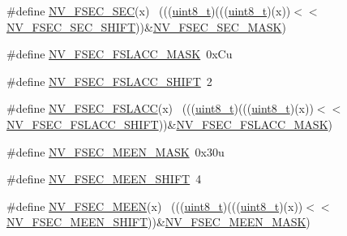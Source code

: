 \begin{DoxyCompactItemize}
\#define \hyperlink{group___n_v___register___masks_gad5a8a12d54435f49c62b7f43b53513a8}{N\+V\+\_\+\+F\+S\+E\+C\+\_\+\+S\+EC}(x)                                                  ~(((\hyperlink{_p_e___types_8h_aba7bc1797add20fe3efdf37ced1182c5}{uint8\+\_\+t})(((\hyperlink{_p_e___types_8h_aba7bc1797add20fe3efdf37ced1182c5}{uint8\+\_\+t})(x))$<$$<$\hyperlink{group___n_v___register___masks_ga92a819b24b0472a83857ddd2d950ab08}{N\+V\+\_\+\+F\+S\+E\+C\+\_\+\+S\+E\+C\+\_\+\+S\+H\+I\+FT}))\&\hyperlink{group___n_v___register___masks_gab159c721c6cde1f629b630c573da8ea9}{N\+V\+\_\+\+F\+S\+E\+C\+\_\+\+S\+E\+C\+\_\+\+M\+A\+SK})
\item 
\#define \hyperlink{group___n_v___register___masks_ga8fd3b6696c82aa96017fe25be34d19c9}{N\+V\+\_\+\+F\+S\+E\+C\+\_\+\+F\+S\+L\+A\+C\+C\+\_\+\+M\+A\+SK}~0x\+Cu
\item 
\#define \hyperlink{group___n_v___register___masks_gaba549ee99b8ca1af3531eafd5746f6b6}{N\+V\+\_\+\+F\+S\+E\+C\+\_\+\+F\+S\+L\+A\+C\+C\+\_\+\+S\+H\+I\+FT}~2
\item 
\#define \hyperlink{group___n_v___register___masks_gae4a6264735dd8537ff6a3a993a8c50d8}{N\+V\+\_\+\+F\+S\+E\+C\+\_\+\+F\+S\+L\+A\+CC}(x)                                            ~(((\hyperlink{_p_e___types_8h_aba7bc1797add20fe3efdf37ced1182c5}{uint8\+\_\+t})(((\hyperlink{_p_e___types_8h_aba7bc1797add20fe3efdf37ced1182c5}{uint8\+\_\+t})(x))$<$$<$\hyperlink{group___n_v___register___masks_gaba549ee99b8ca1af3531eafd5746f6b6}{N\+V\+\_\+\+F\+S\+E\+C\+\_\+\+F\+S\+L\+A\+C\+C\+\_\+\+S\+H\+I\+FT}))\&\hyperlink{group___n_v___register___masks_ga8fd3b6696c82aa96017fe25be34d19c9}{N\+V\+\_\+\+F\+S\+E\+C\+\_\+\+F\+S\+L\+A\+C\+C\+\_\+\+M\+A\+SK})
\item 
\#define \hyperlink{group___n_v___register___masks_ga02f5aa86e1f5bceefd0378fa736d5656}{N\+V\+\_\+\+F\+S\+E\+C\+\_\+\+M\+E\+E\+N\+\_\+\+M\+A\+SK}~0x30u
\item 
\#define \hyperlink{group___n_v___register___masks_ga13adfbdf46af9e59b446d17ce90b49c1}{N\+V\+\_\+\+F\+S\+E\+C\+\_\+\+M\+E\+E\+N\+\_\+\+S\+H\+I\+FT}~4
\item 
\#define \hyperlink{group___n_v___register___masks_gafb2cb85643ad7aa0997ed49baa90379f}{N\+V\+\_\+\+F\+S\+E\+C\+\_\+\+M\+E\+EN}(x)                                                ~(((\hyperlink{_p_e___types_8h_aba7bc1797add20fe3efdf37ced1182c5}{uint8\+\_\+t})(((\hyperlink{_p_e___types_8h_aba7bc1797add20fe3efdf37ced1182c5}{uint8\+\_\+t})(x))$<$$<$\hyperlink{group___n_v___register___masks_ga13adfbdf46af9e59b446d17ce90b49c1}{N\+V\+\_\+\+F\+S\+E\+C\+\_\+\+M\+E\+E\+N\+\_\+\+S\+H\+I\+FT}))\&\hyperlink{group___n_v___register___masks_ga02f5aa86e1f5bceefd0378fa736d5656}{N\+V\+\_\+\+F\+S\+E\+C\+\_\+\+M\+E\+E\+N\+\_\+\+M\+A\+SK})
$$
\end{DoxyCompactItemize}
